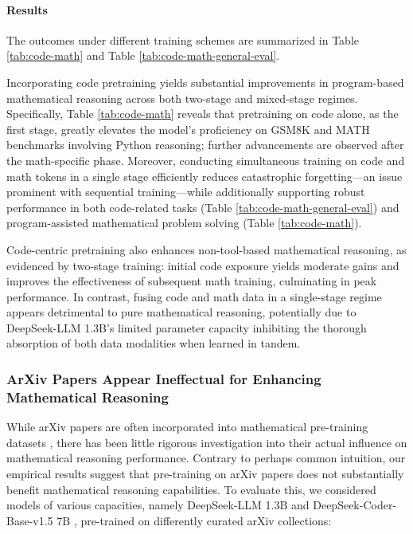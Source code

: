\begin{itemize}[topsep=0pt]
\paragraph{Results}
The outcomes under different training schemes are summarized in Table \ref{tab:code-math} and Table \ref{tab:code-math-general-eval}.

Incorporating code pretraining yields substantial improvements in program-based mathematical reasoning across both two-stage and mixed-stage regimes. Specifically, Table \ref{tab:code-math} reveals that pretraining on code alone, as the first stage, greatly elevates the model’s proficiency on GSM8K and MATH benchmarks involving Python reasoning; further advancements are observed after the math-specific phase. Moreover, conducting simultaneous training on code and math tokens in a single stage efficiently reduces catastrophic forgetting—an issue prominent with sequential training—while additionally supporting robust performance in both code-related tasks (Table \ref{tab:code-math-general-eval}) and program-assisted mathematical problem solving (Table \ref{tab:code-math}).

Code-centric pretraining also enhances non-tool-based mathematical reasoning, as evidenced by two-stage training: initial code exposure yields moderate gains and improves the effectiveness of subsequent math training, culminating in peak performance. In contrast, fusing code and math data in a single-stage regime appears detrimental to pure mathematical reasoning, potentially due to DeepSeek-LLM 1.3B’s limited parameter capacity inhibiting the thorough absorption of both data modalities when learned in tandem.

\subsubsection{ArXiv Papers Appear Ineffectual for Enhancing Mathematical Reasoning}

While arXiv papers are often incorporated into mathematical pre-training datasets \citep{minerva,gpt-f,llemma,mathpile}, there has been little rigorous investigation into their actual influence on mathematical reasoning performance. Contrary to perhaps common intuition, our empirical results suggest that pre-training on arXiv papers does not substantially benefit mathematical reasoning capabilities. To evaluate this, we considered models of various capacities, namely DeepSeek-LLM 1.3B and DeepSeek-Coder-Base-v1.5 7B \citep{deepseek-coder}, pre-trained on differently curated arXiv collections:


\end{itemize}
